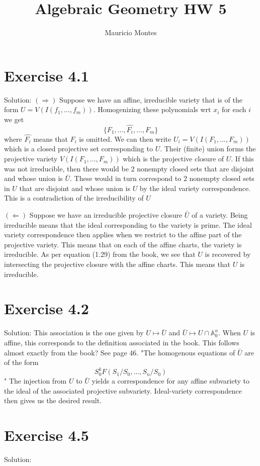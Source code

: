 \documentclass[12pt]{article}
\title{Algebraic Geometry HW 5}
\author{Mauricio Montes}
\begin{document}
\maketitle

\section{Exercise 4.1}

Solution: $(\Rightarrow)$  Suppose we have an affine, irreducible variety that is of the form $U = V(I(f_1, \ldots, f_m))$. 
Homogenizing these polynomials wrt $x_i$ for each $i$ we get 
\begin{equation*}
\{ F_1, \ldots, \hat{F_i}, \ldots, F_m \}
\end{equation*}
where $\hat{F_i}$ means that $F_i$ is omitted.  We can then write $U_i = V(I(F_1, \ldots, F_m))$ which is a closed projective set corresponding
to $U$. Their (finite) union forms the projective variety $V(I(F_1, \ldots, F_m))$ which is the projective closure of $U$.
If this was not irreducible, then there would be 2 nonempty closed sets that are disjoint and whose union is $\bar{U}$. These
would in turn correspond to 2 nonempty closed sets in $U$ that are disjoint and whose union is $U$ by the ideal variety correspondence.
This is a contradiction of the irreducibility of $U$

$(\Leftarrow)$ Suppose we have an irreducible projective closure $\bar{U}$ of a variety. Being irreducible means that the ideal corresponding to
the variety is prime. The ideal variety correspondence then applies when we restrict to the affine part of the projective variety. This means that on 
each of the affine charts, the variety is irreducible. As per equation (1.29) from the book, we see that $U$ is recovered by intersecting the projective
closure with the affine charts. This means that $U$ is irreducible.

\section{Exercise 4.2}

Solution: This association is the one given by $U \mapsto \bar{U}$ and $\bar{U} \mapsto U \cap \mathbb{A}^n _0$. When $U$ is affine, this corresponds to the
definition associated in the book. This follows almost exactly from the book? See page 46. "The homogenous equations of $\bar{U}$ are of the form
\begin{equation*}
  S^k _0 F(S_1 / S_0, \ldots, S_n / S_0)
\end{equation*}"
The injection from $U$ to $\bar{U}$ yields a correspondence for any affine subvariety to the ideal of the associated projective subvariety. Ideal-variety correspondence
then gives us the desired result. 

\section{Exercise 4.5}

Solution: 
\end{document}
